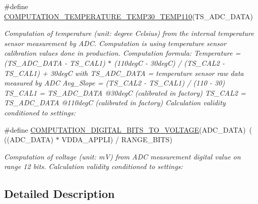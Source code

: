 \begin{DoxyCompactItemize}
\item 
\#define \hyperlink{group__cpu-adc-utilities_ga5621ec04f58777b467e339966f910e54}{C\-O\-M\-P\-U\-T\-A\-T\-I\-O\-N\-\_\-\-T\-E\-M\-P\-E\-R\-A\-T\-U\-R\-E\-\_\-\-T\-E\-M\-P30\-\_\-\-T\-E\-M\-P110}(T\-S\-\_\-\-A\-D\-C\-\_\-\-D\-A\-T\-A)
\begin{DoxyCompactList}\small\item\em Computation of temperature (unit\-: degree Celsius) from the internal temperature sensor measurement by A\-D\-C. Computation is using temperature sensor calibration values done in production. Computation formula\-: Temperature = (T\-S\-\_\-\-A\-D\-C\-\_\-\-D\-A\-T\-A -\/ T\-S\-\_\-\-C\-A\-L1) $\ast$ (110deg\-C -\/ 30deg\-C) / (T\-S\-\_\-\-C\-A\-L2 -\/ T\-S\-\_\-\-C\-A\-L1) + 30deg\-C with T\-S\-\_\-\-A\-D\-C\-\_\-\-D\-A\-T\-A = temperature sensor raw data measured by A\-D\-C Avg\-\_\-\-Slope = (T\-S\-\_\-\-C\-A\-L2 -\/ T\-S\-\_\-\-C\-A\-L1) / (110 -\/ 30) T\-S\-\_\-\-C\-A\-L1 = T\-S\-\_\-\-A\-D\-C\-\_\-\-D\-A\-T\-A @30deg\-C (calibrated in factory) T\-S\-\_\-\-C\-A\-L2 = T\-S\-\_\-\-A\-D\-C\-\_\-\-D\-A\-T\-A @110deg\-C (calibrated in factory) Calculation validity conditioned to settings\-: \end{DoxyCompactList}\item 
\#define \hyperlink{group__cpu-adc-utilities_ga793e1b3d3c834d5402767910f604a209}{C\-O\-M\-P\-U\-T\-A\-T\-I\-O\-N\-\_\-\-D\-I\-G\-I\-T\-A\-L\-\_\-B\-I\-T\-S\-\_\-\-T\-O\-\_\-\-V\-O\-L\-T\-A\-G\-E}(A\-D\-C\-\_\-\-D\-A\-T\-A)~( ((A\-D\-C\-\_\-\-D\-A\-T\-A) $\ast$ V\-D\-D\-A\-\_\-\-A\-P\-P\-L\-I) / R\-A\-N\-G\-E\-\_\-B\-I\-T\-S)
\begin{DoxyCompactList}\small\item\em Computation of voltage (unit\-: m\-V) from A\-D\-C measurement digital value on range 12 bits. Calculation validity conditioned to settings\-: \end{DoxyCompactList}\end{DoxyCompactItemize}


\subsection{Detailed Description}



